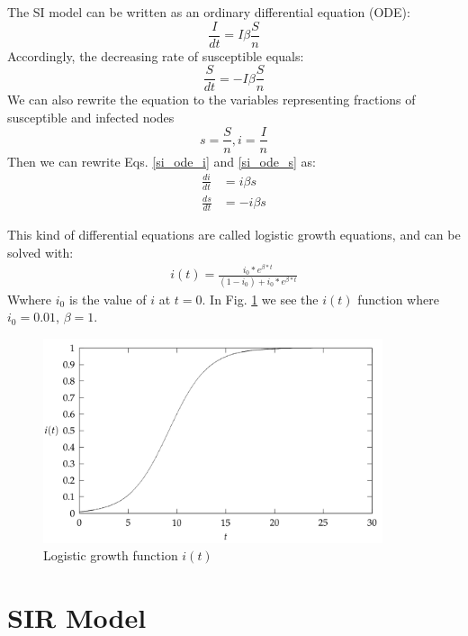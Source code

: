 The SI model can be written as an ordinary differential equation (ODE):
\begin{equation} \label{si_ode_i}
\frac{I}{dt} = I \beta \frac{S}{n}
\end{equation}
Accordingly, the decreasing rate of susceptible equals:
\begin{equation} \label{si_ode_s}
\frac{S}{dt} = -I \beta \frac{S}{n}
\end{equation}
We can also rewrite the equation to the variables representing fractions of susceptible and infected nodes
\begin{equation}
s = \frac{S}{n}, i = \frac{I}{n}
\end{equation}
Then we can rewrite Eqs. \ref{si_ode_i} and \ref{si_ode_s} as:
\begin{equation}
\begin{split}
\frac{di}{dt} &= i \beta s \\
\frac{ds}{dt} &= -i \beta s
\end{split}
\end{equation}

This kind of differential equations are called logistic growth equations, and can be solved with:
\begin{equation}
\begin{split}
i(t) =\frac{ i_0 * e^{\beta*t} }{(1 - i_0) + i_0 * e^{\beta*t}}
\end{split}
\end{equation}
Wwhere $i_0$ is the value of $i$ at $t = 0$. In Fig. \ref{fig:logistic_growth} we see the $i(t)$ function where $i_0 = 0.01$, $\beta = 1$.

\begin{figure}[h!]
    \centering
    \includegraphics[height=6cm]{img/logistic_growth.png}
    \caption{Logistic growth function $i(t)$}
    \label{fig:logistic_growth}
\end{figure}

\section{SIR Model}

